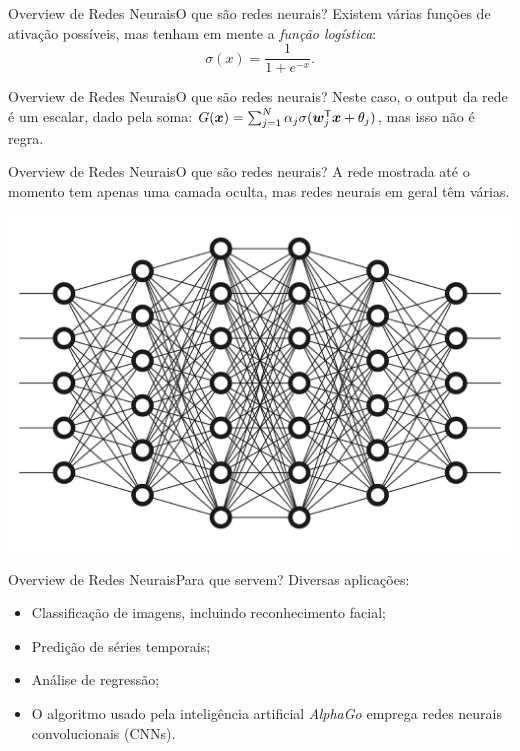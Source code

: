 \documentclass[13pt]{beamer}
\begin{document}
\begin{frame}{Overview de Redes Neurais}{O que são redes neurais?}
    \vspace{2pt}
    Existem várias funções de ativação possíveis, mas tenham em mente a \emph{função logística}:
    \begin{equation*}
        \sigma ( x ) = \frac{ 1 }{ 1 + e^{ -x } }
    .\end{equation*}
    \begin{center}
        
    \end{center}
\end{frame}

\begin{frame}{Overview de Redes Neurais}{O que são redes neurais?}
    \vspace{2pt}
    Neste caso, o output da rede é um escalar, dado pela soma:
    \(
        G ( \bm{x} ) = \sum_{ j=1 }^{ N } \alpha_{ j } \sigma ( \bm{w}_{ j }^{ \mathsf{T} } \bm{x} + \theta_{ j } )
        \),
    mas isso não é regra.
    \begin{center}
        
    \end{center}
\end{frame}

\begin{frame}{Overview de Redes Neurais}{O que são redes neurais?}
    \vspace{2pt}
    A rede mostrada até o momento tem apenas uma camada oculta, mas redes neurais em geral têm várias.
    \begin{center}
        \includegraphics[width=.7\textwidth]{../figuras/multi-layer-neural-network.jpeg}
    \end{center}
\end{frame}

\begin{frame}{Overview de Redes Neurais}{Para que servem?}
    \vspace{2pt}
    Diversas aplicações:
    \begin{itemize}
        \item Classificação de imagens, incluindo reconhecimento facial;
        \item Predição de séries temporais;
        \item Análise de regressão;
        \item O algoritmo usado pela inteligência artificial \emph{AlphaGo} emprega redes neurais convolucionais (CNNs).
    \end{itemize}
\end{frame}
\end{document}
